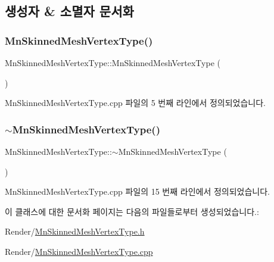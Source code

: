 \subsection{생성자 \& 소멸자 문서화}
\mbox{\label{class_m_n_l_1_1_mn_skinned_mesh_vertex_type_abe942c6fd7df3e6897c1412d0bb85d59}} 
\subsubsection{\texorpdfstring{Mn\+Skinned\+Mesh\+Vertex\+Type()}{MnSkinnedMeshVertexType()}}
{\footnotesize\ttfamily Mn\+Skinned\+Mesh\+Vertex\+Type\+::\+Mn\+Skinned\+Mesh\+Vertex\+Type (\begin{DoxyParamCaption}{ }\end{DoxyParamCaption})}



Mn\+Skinned\+Mesh\+Vertex\+Type.\+cpp 파일의 5 번째 라인에서 정의되었습니다.

\mbox{\label{class_m_n_l_1_1_mn_skinned_mesh_vertex_type_af6d0b18b1bbb9c876c20550c125a962b}} 
\subsubsection{\texorpdfstring{$\sim$\+Mn\+Skinned\+Mesh\+Vertex\+Type()}{~MnSkinnedMeshVertexType()}}
{\footnotesize\ttfamily Mn\+Skinned\+Mesh\+Vertex\+Type\+::$\sim$\+Mn\+Skinned\+Mesh\+Vertex\+Type (\begin{DoxyParamCaption}{ }\end{DoxyParamCaption})}



Mn\+Skinned\+Mesh\+Vertex\+Type.\+cpp 파일의 15 번째 라인에서 정의되었습니다.



이 클래스에 대한 문서화 페이지는 다음의 파일들로부터 생성되었습니다.\+:\begin{DoxyCompactItemize}
\item 
Render/\hyperlink{_mn_skinned_mesh_vertex_type_8h}{Mn\+Skinned\+Mesh\+Vertex\+Type.\+h}\item 
Render/\hyperlink{_mn_skinned_mesh_vertex_type_8cpp}{Mn\+Skinned\+Mesh\+Vertex\+Type.\+cpp}\end{DoxyCompactItemize}
